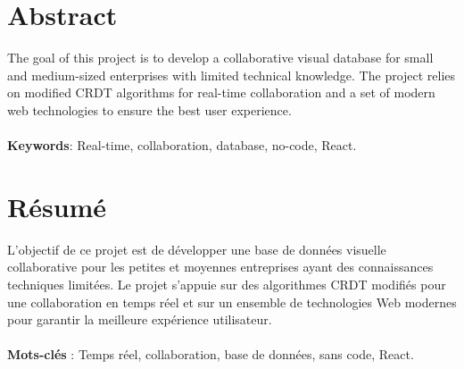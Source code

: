 


\begingroup

\section*{Abstract}
The goal of this project is to develop a collaborative visual database for small and medium-sized enterprises with limited technical knowledge. The project relies on modified CRDT algorithms for real-time collaboration and a set of modern web technologies to ensure the best user experience.
\\~\\
\textbf{Keywords}: Real-time, collaboration, database, no-code, React.

\vspace{1cm}

\section*{Résumé}
L'objectif de ce projet est de développer une base de données visuelle collaborative pour les petites et moyennes entreprises ayant des connaissances techniques limitées. Le projet s'appuie sur des algorithmes CRDT modifiés pour une collaboration en temps réel et sur un ensemble de technologies Web modernes pour garantir la meilleure expérience utilisateur.
\\~\\
\textbf{Mots-clés} : Temps réel, collaboration, base de données, sans code, React.

\endgroup

